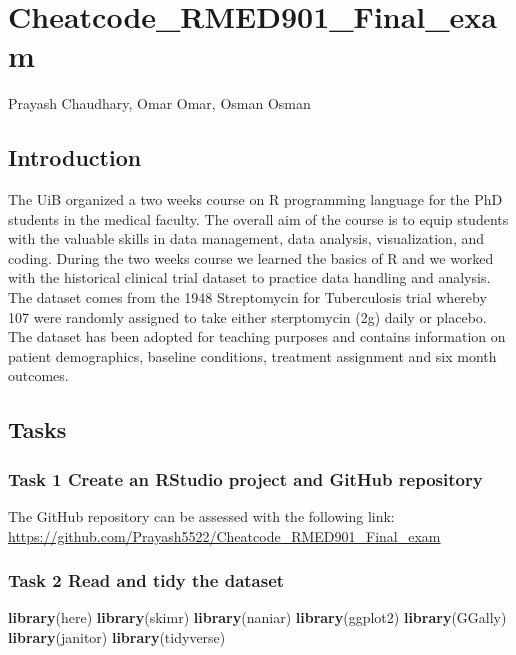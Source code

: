 \documentclass[
]{article}
\author{}
\date{\vspace{-2.5em}}
\newenvironment{Shaded}{\begin{snugshade}}{\end{snugshade}}
\newcommand{\FunctionTok}[1]{\textcolor[rgb]{0.13,0.29,0.53}{\textbf{#1}}}
\newcommand{\NormalTok}[1]{#1}
\begin{document}
\section{Cheatcode\_RMED901\_Final\_exam}\label{cheatcode_rmed901_final_exam}

Prayash Chaudhary, Omar Omar, Osman Osman

\subsection{Introduction}\label{introduction}

The UiB organized a two weeks course on R programming language for the
PhD students in the medical faculty. The overall aim of the course is to
equip students with the valuable skills in data management, data
analysis, visualization, and coding. During the two weeks course we
learned the basics of R and we worked with the historical clinical trial
dataset to practice data handling and analysis. The dataset comes from
the 1948 Streptomycin for Tuberculosis trial whereby 107 were randomly
assigned to take either sterptomycin (2g) daily or placebo. The dataset
has been adopted for teaching purposes and contains information on
patient demographics, baseline conditions, treatment assignment and six
month outcomes.

\subsection{Tasks}\label{tasks}

\subsubsection{Task 1 Create an RStudio project and GitHub
repository}\label{task-1-create-an-rstudio-project-and-github-repository}

The GitHub repository can be assessed with the following link:
\url{https://github.com/Prayash5522/Cheatcode_RMED901_Final_exam}

\subsubsection{Task 2 Read and tidy the
dataset}\label{task-2-read-and-tidy-the-dataset}

\begin{Shaded}
\begin{Highlighting}[]
\FunctionTok{library}\NormalTok{(here)}
\FunctionTok{library}\NormalTok{(skimr)}
\FunctionTok{library}\NormalTok{(naniar)}
\FunctionTok{library}\NormalTok{(ggplot2)}
\FunctionTok{library}\NormalTok{(GGally)}
\FunctionTok{library}\NormalTok{(janitor)}
\FunctionTok{library}\NormalTok{(tidyverse)}
\end{Highlighting}
\end{Shaded}
\end{document}
